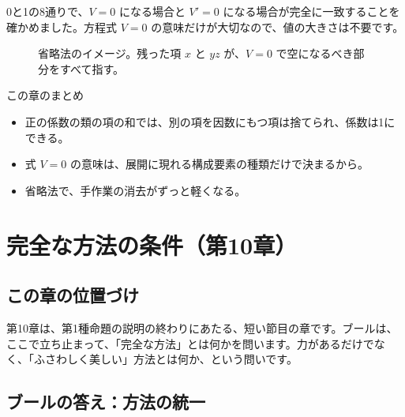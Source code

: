 \documentclass[a4paper,11pt,openany]{ltjsbook}
\begin{document}
0と1の8通りで、$V=0$ になる場合と $V'=0$ になる場合が完全に一致することを確かめました。方程式 $V=0$ の意味だけが大切なので、値の大きさは不要です。

\begin{figure}[htbp]
\centering
{}
\caption{省略法のイメージ。残った項 $x$ と $yz$ が、$V=0$ で空になるべき部分をすべて指す。}
\end{figure}

\begin{pointbox}{この章のまとめ}
\begin{itemize}[leftmargin=*]
\item 正の係数の類の項の和では、別の項を因数にもつ項は捨てられ、係数は1にできる。
\item 式 $V=0$ の意味は、展開に現れる構成要素の種類だけで決まるから。
\item 省略法で、手作業の消去がずっと軽くなる。
\end{itemize}
\end{pointbox}

\chapter{完全な方法の条件（第10章）}

\section{この章の位置づけ}

第10章は、第1種命題の説明の終わりにあたる、短い節目の章です。ブールは、ここで立ち止まって、「完全な方法」とは何かを問います。力があるだけでなく、「ふさわしく美しい」方法とは何か、という問いです。

\section{ブールの答え：方法の統一}
\end{document}
